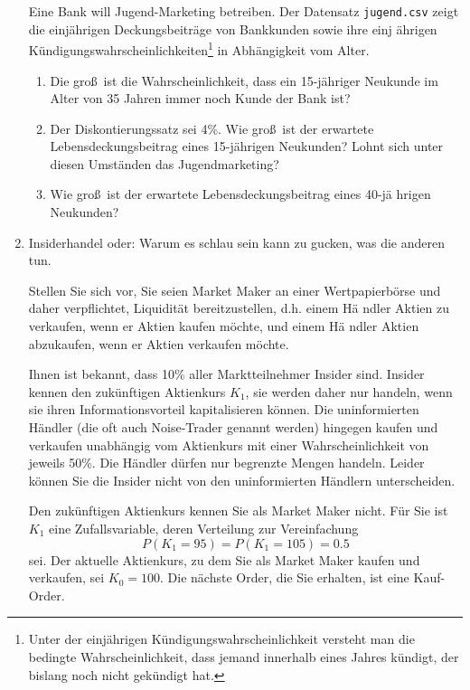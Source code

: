 \begin{enumerate}
Eine Bank will Jugend-Marketing betreiben. Der Datensatz \texttt{jugend.csv}
zeigt die einj\"{a}hrigen Deckungsbeitr\"{a}ge von Bankkunden sowie ihre einj%
\"{a}hrigen K\"{u}ndigungswahrscheinlichkeiten\footnote{%
Unter der einj\"{a}hrigen K\"{u}ndigungswahrscheinlichkeit versteht man die
bedingte Wahrscheinlichkeit, dass jemand innerhalb eines Jahres k\"{u}ndigt,
der bislang noch nicht gek\"{u}ndigt hat.} in Abh\"{a}ngigkeit vom Alter.
\begin{enumerate}
\item Die gro\ss\ ist die Wahrscheinlichkeit, dass ein 15-j\"{a}hriger
Neukunde im Alter von 35 Jahren immer noch Kunde der Bank ist?
\item Der Diskontierungssatz sei 4\%. Wie gro\ss\ ist der erwartete
Lebensdeckungsbeitrag eines 15-j\"{a}hrigen Neukunden? Lohnt sich unter
diesen Umst\"{a}nden das Jugendmarketing?
\item Wie gro\ss\ ist der erwartete Lebensdeckungsbeitrag eines 40-j\"{a}%
hrigen Neukunden?
\end{enumerate}

\item Insiderhandel oder: Warum es schlau sein kann zu gucken, was die anderen tun.

Stellen Sie sich vor, Sie seien Market Maker an einer Wertpapierb\"{o}rse
und daher verpflichtet, Liquidit\"{a}t bereitzustellen, d.h. einem H\"{a}%
ndler Aktien zu verkaufen, wenn er Aktien kaufen m\"{o}chte, und einem H\"{a}%
ndler Aktien abzukaufen, wenn er Aktien verkaufen m\"{o}chte.

Ihnen ist bekannt, dass 10\% aller Marktteilnehmer Insider sind. Insider
kennen den zu\-k\"{u}nf\-ti\-gen Aktienkurs $K_{1}$, sie werden daher nur
handeln, wenn sie ihren Informationsvorteil kapitalisieren k\"{o}nnen. Die
uninformierten H\"{a}ndler (die oft auch Noise-Trader genannt werden)
hingegen kaufen und verkaufen unabh\"{a}ngig vom Aktienkurs mit einer
Wahrscheinlichkeit von jeweils 50\%. Die H\"{a}ndler d\"{u}rfen nur
begrenzte Mengen handeln. Leider k\"{o}nnen Sie die Insider nicht von den
uninformierten H\"{a}ndlern unterscheiden.

Den zuk\"{u}nftigen Aktienkurs kennen Sie als Market Maker nicht. F\"{u}r
Sie ist $K_{1}$ eine Zufallsvariable, deren Verteilung zur Vereinfachung 
\begin{equation*}
P(K_{1}=95)=P(K_{1}=105)=0.5
\end{equation*}%
sei. Der aktuelle Aktienkurs, zu dem Sie als Market Maker kaufen und
verkaufen, sei $K_{0}=100$. Die n\"{a}chste Order, die Sie erhalten, ist
eine Kauf-Order.


\end{enumerate}
